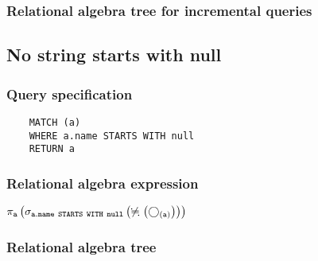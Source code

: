 	\subsubsection*{Relational algebra tree for incremental queries}

	\subsection{No string starts with null}

	\subsubsection*{Query specification}

	\begin{lstlisting}
	MATCH (a)
	WHERE a.name STARTS WITH null
	RETURN a
	\end{lstlisting}


	\subsubsection*{Relational algebra expression}

	$\projection{\var{a}} \left(\selection{\mathtt{a.name~STARTS~WITH~null}} \left(\alldifferent{} \left(\getvertices{a}{}\right)\right)\right)$

	\subsubsection*{Relational algebra tree}


